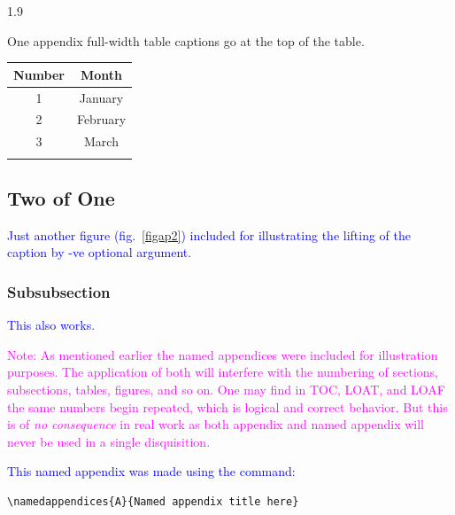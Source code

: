 \documentclass[phd]{ndsu-thesis-2022}
\newcommand\myspacing{1.9} %
\newcommand\italk[1]{\textcolor{blue}{#1}}  %
\begin{document}
\begin{spacing}{\myspacing}
\begin{appendixtable}[h]
\centering
\caption{One appendix full-width table captions go at the top of the table.}
\setlength\tabcolsep{1.3in}
\begin{tabular}{cc}
\toprule
Number & Month \\
\midrule
1 & January \\
2 & February \\
3 & March\\
\bottomrule
\label{aptab1}
\end{tabular}
\end{appendixtable}

\subsection{Two of One}

\italk{Just another figure (fig.~\ref{figap2}) included for illustrating the lifting of the caption by -ve optional argument. }


\subsubsection{Subsubsection}
\italk{This also works.}



\textcolor{magenta}{Note: As mentioned earlier the named appendices were included for illustration purposes. The application of both will interfere with the numbering of sections, subsections, tables, figures, and so on. One may find in TOC, LOAT, and LOAF the same numbers begin repeated, which is logical and correct behavior. But this is of \emph{no consequence} in real work as both appendix and named appendix will never be used in a single disquisition.}

\italk{This named appendix was made using the command:}

\begin{verbatim}
\namedappendices{A}{Named appendix title here}
\end{verbatim}


\end{spacing}
\end{document}
